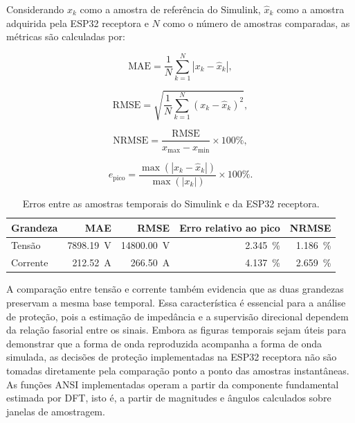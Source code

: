 Considerando $x_k$ como a amostra de referência do Simulink, $\hat{x}_k$ como a amostra adquirida pela ESP32 receptora e $N$ como o número de amostras comparadas, as métricas são calculadas por:

\begin{equation}
  \mathrm{MAE}=\frac{1}{N}\sum_{k=1}^{N}\left|x_k-\hat{x}_k\right|,
  \label{eq:mae-resultados}
\end{equation}

\begin{equation}
  \mathrm{RMSE}=\sqrt{\frac{1}{N}\sum_{k=1}^{N}\left(x_k-\hat{x}_k\right)^2},
  \label{eq:rmse-resultados}
\end{equation}

\begin{equation}
  \mathrm{NRMSE}=\frac{\mathrm{RMSE}}{x_{\max}-x_{\min}}\times 100\%,
  \label{eq:nrmse-resultados}
\end{equation}

\begin{equation}
  e_{\mathrm{pico}}=\frac{\max\left(\left|x_k-\hat{x}_k\right|\right)}{\max\left(\left|x_k\right|\right)}\times 100\%.
  \label{eq:erro-pico-resultados}
\end{equation}

\begin{table}[H]
  \centering
  \small
  \caption{Erros entre as amostras temporais do Simulink e da ESP32 receptora.}
  \label{tab:erros-temporais-reprodutibilidade}
  \begin{tabular}{lrrrr}
    \toprule
    Grandeza & MAE & RMSE & Erro relativo ao pico & NRMSE \\
    \midrule
    Tensão & \SI{7898,19}{\volt} & \SI{14800,00}{\volt} & \SI{2,345}{\percent} & \SI{1,186}{\percent} \\
    Corrente & \SI{212,52}{\ampere} & \SI{266,50}{\ampere} & \SI{4,137}{\percent} & \SI{2,659}{\percent} \\
    \bottomrule
  \end{tabular}
\end{table}

A comparação entre tensão e corrente também evidencia que as duas grandezas preservam a mesma base temporal. Essa característica é essencial para a análise de proteção, pois a estimação de impedância e a supervisão direcional dependem da relação fasorial entre os sinais. Embora as figuras temporais sejam úteis para demonstrar que a forma de onda reproduzida acompanha a forma de onda simulada, as decisões de proteção implementadas na ESP32 receptora não são tomadas diretamente pela comparação ponto a ponto das amostras instantâneas. As funções ANSI implementadas operam a partir da componente fundamental estimada por DFT, isto é, a partir de magnitudes e ângulos calculados sobre janelas de amostragem.

